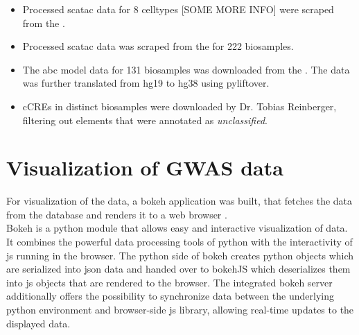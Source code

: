 \begin{itemize}
    \item {} Processed sc\ac{atac} data for 8 celltypes [SOME MORE INFO] were scraped from the .

    \item {} Processed \ac{sc}\ac{atac} data was scraped from the  for 222 biosamples.

    \item {} The \ac{abc} model data for 131 biosamples was downloaded from the . The data was further translated from \ac{hg19} to \ac{hg38} using pyliftover.

    \item {} \acp{cCRE} in distinct biosamples were downloaded by Dr. Tobias Reinberger, filtering out elements that were annotated as \textit{unclassified}.
\end{itemize}

\section{Visualization of GWAS data}
\label{sec:gwas_vis}
For visualization of the data, a bokeh application was built, that fetches the data from the database and renders it to a web browser \cite{bokehdevelopmentteamBokehPythonLibrary2022}.\\
Bokeh is a python module that allows easy and interactive visualization of data. It combines the powerful data processing tools of python with the interactivity of \ac{js} running in the browser. The python side of bokeh creates python objects which are serialized into \ac{json} data and handed over to bokehJS which deserializes them into \ac{js} objects that are rendered to the browser. The integrated bokeh server additionally offers the possibility to synchronize data between the underlying python environment and browser-side \ac{js} library, allowing real-time updates to the displayed data.

